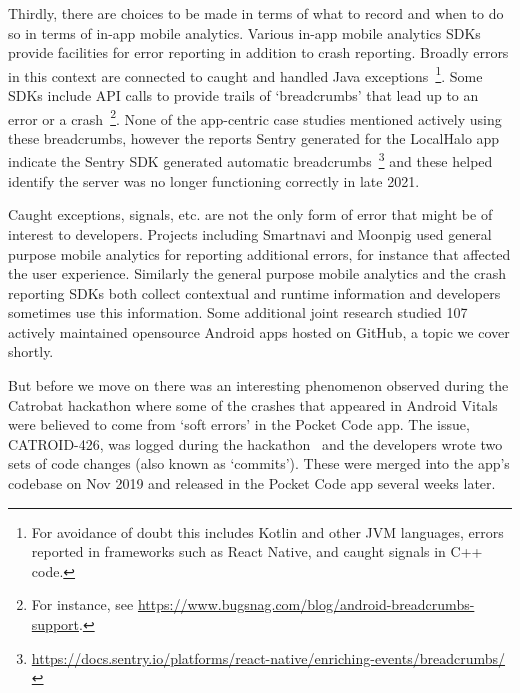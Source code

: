 Thirdly, there are choices to be made in terms of what to record and when to do so in terms of in-app mobile analytics. Various in-app mobile analytics SDKs provide facilities for error reporting in addition to crash reporting. Broadly errors in this context are connected to caught and handled Java exceptions~\footnote{For avoidance of doubt this includes Kotlin and other JVM languages, errors reported in frameworks such as React Native, and caught signals in C++ code.}. Some SDKs include API calls to provide trails of `breadcrumbs' that lead up to an error or a crash~\footnote{For instance, see \url{https://www.bugsnag.com/blog/android-breadcrumbs-support}.}. None of the app-centric case studies mentioned actively using these breadcrumbs, however the reports Sentry generated for the LocalHalo app indicate the Sentry SDK generated automatic breadcrumbs~\footnote{\url{https://docs.sentry.io/platforms/react-native/enriching-events/breadcrumbs/}} and these helped identify the server was no longer functioning correctly in late 2021. 


Caught exceptions, signals, etc. are not the only form of error that might be of interest to developers. Projects including Smartnavi and Moonpig used general purpose mobile analytics for reporting additional errors, for instance that affected the user experience. Similarly the general purpose mobile analytics and the crash reporting SDKs both collect contextual and runtime information and developers sometimes use this information. Some additional joint research studied 107 actively maintained opensource Android apps hosted on GitHub, a topic we cover shortly.

But before we move on there was an interesting phenomenon observed during the Catrobat hackathon where some of the crashes that appeared in Android Vitals were believed to come from `soft errors' in the Pocket Code app. The issue, CATROID-426, was logged during the hackathon~\citep{catroid_426_soft_crashes_should_not_be_reported_to_the_play_console} and the developers wrote two sets of code changes (also known as `commits'). These were merged into the app's codebase on  Nov 2019 and released in the Pocket Code app several weeks later.

